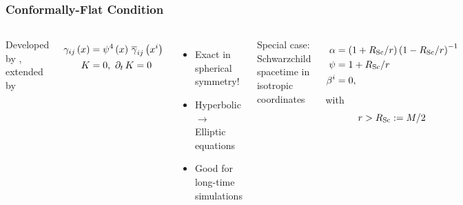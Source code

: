 \documentclass{beamer}
\begin{document}
\begin{frame}
\frametitle{Conformally-Flat Condition}

  \begin{columns}[c]


      Developed by \citet{wmm1996}, extended by \citet{cc2009}

      \begin{align*}
        \gamma_{ij}\left(x\right)
        &=\psi^{4}\left(x\right)\,\overline{\gamma}_{ij}\left(x^{i}\right) \\
        K&=0,\ \partial_{t}\,K=0
      \end{align*}\vspace{1em}

      \begin{itemize}
        \item Exact in spherical symmetry!
        \item Hyperbolic $\rightarrow$ Elliptic equations
        \item Good for long-time simulations
      \end{itemize}


      Special case: Schwarzchild spacetime in isotropic coordinates

      \begin{align*}
        \alpha&=\left(1+R_{\mathrm{Sc}}/r\right)\left(1-R_{\mathrm{Sc}}/r\right)^{-1} \\
        \psi&=1+R_{\mathrm{Sc}}/r \\
        \beta^{i}&=0,
      \end{align*}
      with
      \begin{equation*}
        r>R_{\mathrm{Sc}}:=M/2
      \end{equation*}

  \end{columns}

\end{frame}
\end{document}
